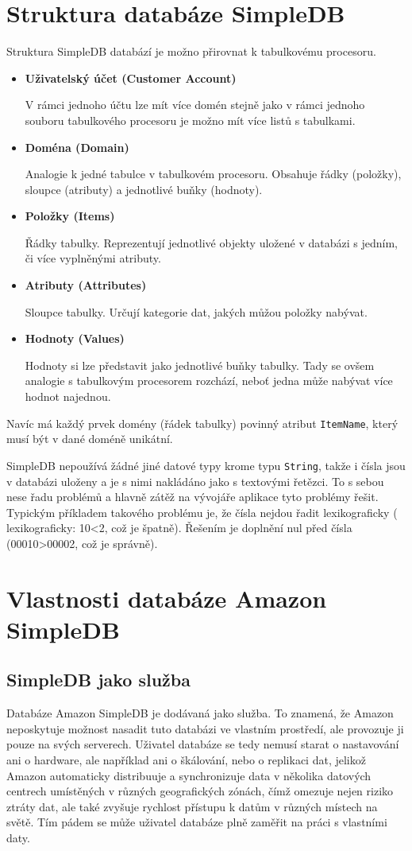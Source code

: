 \documentclass[oneside,12pt,final]{fithesis2}
\begin{document}
\section{Struktura databáze SimpleDB}
Struktura SimpleDB databází je možno přirovnat k tabulkovému procesoru.
\begin{itemize}
 \item \textbf{Uživatelský účet (Customer Account)}
 
 V rámci jednoho účtu lze mít více domén stejně jako v rámci jednoho souboru tabulkového procesoru je možno mít více listů s tabulkami.
 \item \textbf{Doména (Domain)}
 
 Analogie k jedné tabulce v tabulkovém procesoru. Obsahuje řádky (položky), sloupce (atributy) a jednotlivé buňky (hodnoty).
 \item \textbf{Položky (Items)}
 
 Řádky tabulky. Reprezentují jednotlivé objekty uložené v databázi s jedním, či více vyplněnými atributy.
 \item \textbf{Atributy (Attributes)}
 
 Sloupce tabulky. Určují kategorie dat, jakých můžou položky nabývat.
 
 \item \textbf{Hodnoty (Values)}
 
 Hodnoty si lze představit jako jednotlivé buňky tabulky. Tady se ovšem analogie s tabulkovým procesorem rozchází, neboť jedna  může nabývat více hodnot najednou.
 
\end{itemize}
Navíc má každý prvek domény (řádek tabulky) povinný atribut \verb<ItemName<, který musí být v dané doméně unikátní.

SimpleDB nepoužívá žádné jiné datové typy krome typu \verb<String<, takže i čísla jsou v databázi uloženy a je s nimi nakládáno jako s textovými řetězci. To s sebou nese řadu problémů a hlavně zátěž na vývojáře aplikace tyto problémy řešit. Typickým příkladem takového problému je, že čísla nejdou řadit lexikograficky ( lexikograficky: 10<2, což je špatně). Řešením je doplnění nul před čísla (00010>00002, což je správně).

\section{Vlastnosti databáze Amazon SimpleDB}
\subsection{SimpleDB jako služba}
Databáze Amazon SimpleDB je dodávaná jako služba. To znamená, že Amazon neposkytuje možnost nasadit tuto databázi ve vlastním prostředí, ale provozuje ji pouze na svých serverech. Uživatel databáze se tedy nemusí starat o nastavování ani o hardware, ale například ani o škálování, nebo o replikaci dat, jelikož Amazon automaticky distribuuje a synchronizuje data v několika datových centrech umístěných v různých geografických zónách, čímž omezuje nejen riziko ztráty dat, ale také zvyšuje rychlost přístupu k datům v různých místech na světě. Tím pádem se může uživatel databáze plně zaměřit na práci s vlastními daty.
\end{document}
